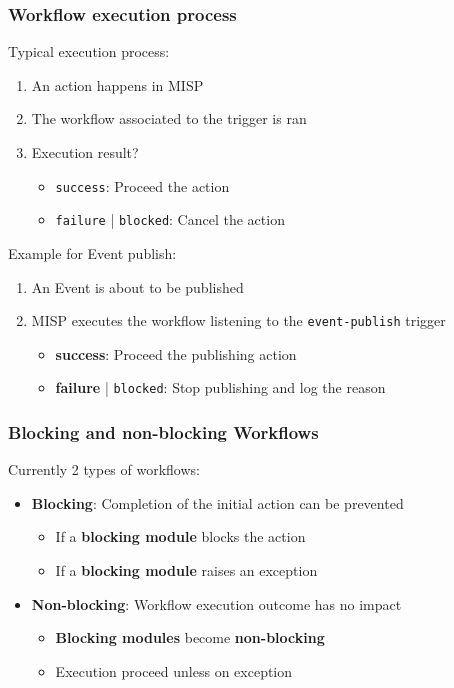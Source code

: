 \begin{frame}
    \frametitle{Workflow execution process}
    Typical execution process:
    \begin{enumerate}
        \item An action happens in MISP
        \item The workflow associated to the trigger is ran
        \item Execution result?
        \begin{itemize}
            \item \texttt{\color{green!50!black}success}: Proceed the action
            \item \texttt{\color{red}failure} | \texttt{\color{blue}blocked}: Cancel the action
        \end{itemize}
    \end{enumerate}
    \vspace{0.5em}
    Example for Event publish:
    \begin{enumerate}
        \item An Event is about to be published
        \item MISP executes the workflow listening to the \texttt{event-publish} trigger
        \begin{itemize}
            \item {\bf\color{green!50!black}success}: Proceed the publishing action
            \item {\bf\color{red}failure} | \texttt{\color{blue}blocked}: Stop publishing and log the reason
        \end{itemize}
    \end{enumerate}
\end{frame}

\begin{frame}
    \frametitle{Blocking and non-blocking Workflows}
    Currently 2 types of workflows:
    \vspace{0.5em}
    \begin{itemize}
        \item {\bf Blocking}: Completion of the initial action can be prevented
        \begin{itemize}
            \item If a \textbf{blocking module} blocks the action
            \item If a \textbf{blocking module} raises an exception
        \end{itemize}
        \vspace{0.5em}
        \item {\bf Non-blocking}: Workflow execution outcome has no impact
        \begin{itemize}
            \item \textbf{Blocking modules} become \textbf{non-blocking}
            \item Execution proceed unless on exception
        \end{itemize}
    \end{itemize}
\end{frame}

